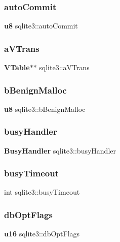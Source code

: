 \mbox{\label{structsqlite3_a11baf5e051b2e4ea03c5d03c09bb624e}} 
\subsubsection{autoCommit}
{\footnotesize\ttfamily \textbf{ u8} sqlite3\+::auto\+Commit}

\mbox{\label{structsqlite3_a9628b6da0f4c7dbde32dcd1249d6a712}} 
\subsubsection{aVTrans}
{\footnotesize\ttfamily \textbf{ V\+Table}$\ast$$\ast$ sqlite3\+::a\+V\+Trans}

\mbox{\label{structsqlite3_a10968de238e6e164e26bf336684aa80b}} 
\subsubsection{bBenignMalloc}
{\footnotesize\ttfamily \textbf{ u8} sqlite3\+::b\+Benign\+Malloc}

\mbox{\label{structsqlite3_a5f50915803efe2ad40dc1a5e31763671}} 
\subsubsection{busyHandler}
{\footnotesize\ttfamily \textbf{ Busy\+Handler} sqlite3\+::busy\+Handler}

\mbox{\label{structsqlite3_a69237f7a2b079706c544f09255fd8905}} 
\subsubsection{busyTimeout}
{\footnotesize\ttfamily int sqlite3\+::busy\+Timeout}

\mbox{\label{structsqlite3_ad4f903754af81d1e646bf966312f9c37}} 
\subsubsection{dbOptFlags}
{\footnotesize\ttfamily \textbf{ u16} sqlite3\+::db\+Opt\+Flags}

